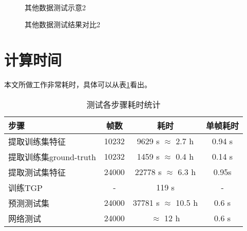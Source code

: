 \begin{figure}[htbp]
  \centering
  \hspace{.5cm}
  \hspace{.5cm}
  \\
  \hspace{.5cm}
  \hspace{.5cm}
  \caption{其他数据测试示意2}\label{fig:mindance}
\end{figure}

\begin{figure}[H]
  \centering
  \hspace{2cm}
  \caption{其他数据测试结果对比2}\label{fig:mindance_result}
\end{figure}

\section{计算时间}
本文所做工作非常耗时，具体可以从表\ref{tab:time}看出。
\begin{table}[H]
  \centering
  \caption{测试各步骤耗时统计}
  \label{tab:time}
    \begin{tabular}{lccc}
      \toprule[1.5pt]
      步骤 & 帧数 & 耗时 & 单帧耗时\\\midrule[1pt]
      提取训练集特征 & 10232 & 9629 s $\approx$ 2.7 h & 0.94 s \\
      提取训练集ground-truth & 10232 & 1459 s $\approx$ 0.4 h & 0.14 s \\
      提取测试集特征 & 24000 & 22778 s $\approx$ 6.3 h & 0.95s\\
      训练TGP & - & 119 s & - \\
      预测测试集 & 24000 & 37781 s $\approx$ 10.5 h & 0.6 s\\
      网络测试 & 24000 & $\approx$ 12 h& 0.6 s\\
      \bottomrule[1.5pt]
    \end{tabular}
\end{table}

